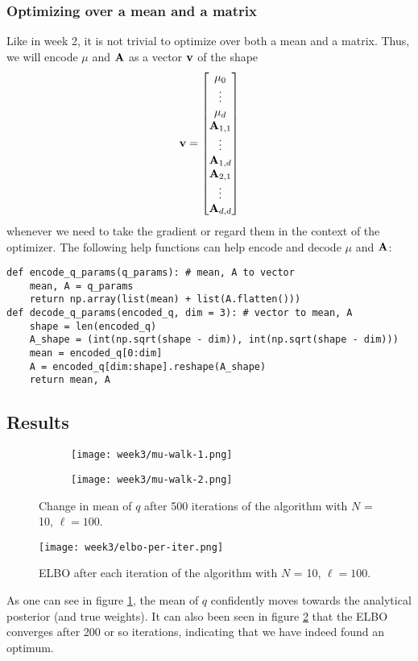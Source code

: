 \subsubsection{Optimizing over a mean and a matrix}
Like in week 2, it is not trivial to optimize over both a mean and a matrix. Thus, we will encode $\mu$ and $\mathbf{A}$ as a vector $\mathbf{v}$ of the shape
$$\mathbf{v}=\begin{bmatrix}\mu_0 \\ \vdots \\ \mu_d \\ \mathbf{A}_{1,1} \\ \vdots \\ \mathbf{A}_{1,d} \\ \mathbf{A}_{2,1} \\ \vdots \\ \mathbf{A}_{d, d}\end{bmatrix}$$
whenever we need to take the gradient or regard them in the context of the optimizer.
The following help functions can help encode and decode $\mu$ and $\mathbf{A}$:
\begin{verbatim}
def encode_q_params(q_params): # mean, A to vector
    mean, A = q_params
    return np.array(list(mean) + list(A.flatten()))
def decode_q_params(encoded_q, dim = 3): # vector to mean, A
    shape = len(encoded_q)
    A_shape = (int(np.sqrt(shape - dim)), int(np.sqrt(shape - dim)))
    mean = encoded_q[0:dim]
    A = encoded_q[dim:shape].reshape(A_shape)
    return mean, A
\end{verbatim}
\subsection{Results}
\begin{figure}[H]
  \centering
  \begin{subfigure}{0.4\textwidth}
    \texttt{[image: week3/mu-walk-1.png]}
  \end{subfigure}
  \begin{subfigure}{0.4\textwidth}
    \texttt{[image: week3/mu-walk-2.png]}
  \end{subfigure}
  \label{fig:mu-walk}
  \caption{Change in mean of $q$ after 500 iterations of the algorithm with $N$ = 10, $\ell = 100$.}
\end{figure}
\begin{figure}[H]
  \centering
  \texttt{[image: week3/elbo-per-iter.png]}
  \label{fig:elbo}
  \caption{ELBO after each iteration of the algorithm with $N$ = 10, $\ell = 100$.}
\end{figure}
As one can see in figure \ref{fig:mu-walk}, the mean of $q$ confidently moves towards the analytical posterior (and true weights).
It can also been seen in figure \ref{fig:elbo} that the ELBO converges after 200 or so iterations, indicating that we have indeed found an optimum.
